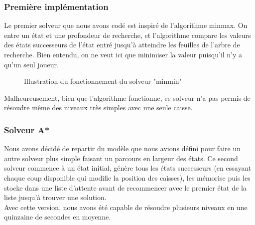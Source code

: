 \documentclass[a4paper,12pt]{article} %
\begin{document}
\subsubsection{Première implémentation}

Le premier solveur que nous avons codé est inspiré de l'algorithme minmax. On entre un état et une profondeur de recherche, et l'algorithme compare les valeurs des états successeurs de l'état entré jusqu'à atteindre les feuilles de l'arbre de recherche. Bien entendu, on ne veut ici que minimiser la valeur puisqu'il n'y a qu'un seul joueur.

\begin{figure}[!h]
\centering
{}
\caption{Illustration du fonctionnement du solveur "minmin"}
\end{figure}

Malheureusement, bien que l'algorithme fonctionne, ce solveur n'a pas permis de résoudre même des niveaux très simples avec une seule caisse.

\subsubsection{Solveur A*}

Nous avons décidé de repartir du modèle que nous avions défini pour faire un autre solveur plus simple faisant un parcours en largeur des états.
Ce second solveur commence à un état initial, génère tous les états successeurs (en essayant chaque coup disponible qui modifie la position des caisses), les mémorise puis les stocke dans une liste d'attente avant de recommencer avec le premier état de la liste jusqu'à trouver une solution.\\
Avec cette version, nous avons été capable de résoudre plusieurs niveaux en une quinzaine de secondes en moyenne.\\
\end{document}
